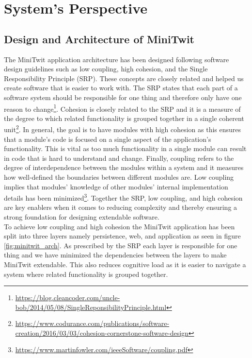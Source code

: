 \section{System's Perspective}

\subsection{Design and Architecture of MiniTwit}
The MiniTwit application architecture has been designed following software design guidelines such as low coupling, high cohesion, and the Single Responsibility Principle (SRP). 
These concepts are closely related and helped us create software that is easier to work with. The SRP states that each part of a software system should be responsible for one thing and therefore only have one reason to change\footnote{\url{https://blog.cleancoder.com/uncle-bob/2014/05/08/SingleReponsibilityPrinciple.html}}. 
Cohesion is closely related to the SRP and it is a measure of the degree to which related functionality is grouped together in a single coherent unit\footnote{\url{https://www.codurance.com/publications/software-creation/2016/03/03/cohesion-cornerstone-software-design}}. 
In general, the goal is to have modules with high cohesion as this ensures that a module's code is focused on a single aspect of the application's functionality. 
This is vital as too much functionality in a single module can result in code that is hard to understand and change. 
Finally, coupling refers to the degree of interdependence between the modules within a system and it measures how well-defined the boundaries between different modules are. 
Low coupling implies that modules' knowledge of other modules' internal implementation details has been minimized\footnote{\url{https://www.martinfowler.com/ieeeSoftware/coupling.pdf}}. 
Together the SRP, low coupling, and high cohesion are key enablers when it comes to reducing complexity and thereby ensuring a strong foundation for designing extendable software. \\

To achieve low coupling and high cohesion the MiniTwit application has been split into three layers namely persistence, web, and application as seen in figure \ref{fig:minitwit_arch}. 
As prescribed by the SRP each layer is responsible for one thing and we have minimized the dependencies between the layers to make MiniTwit extendable.
 This also reduces cognitive load as it is easier to navigate a system where related functionality is grouped together. 


